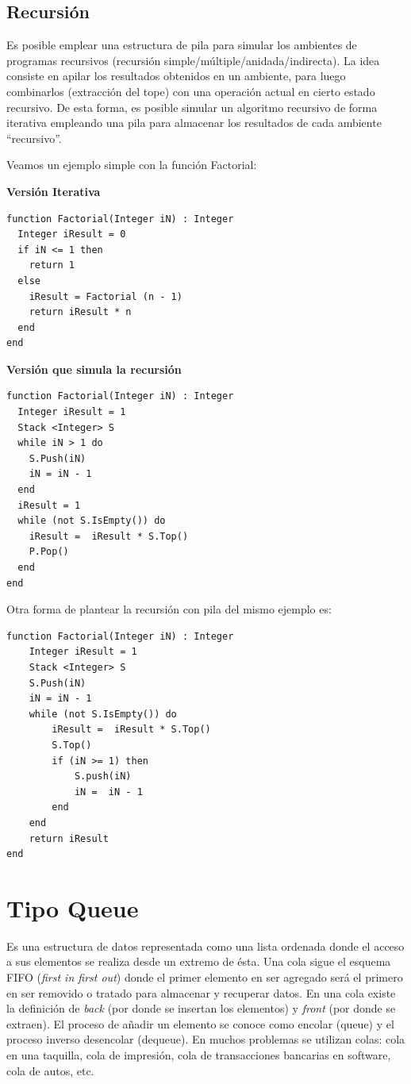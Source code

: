 \subsection{Recursión} \label{sec:recstack}

Es posible emplear una estructura de pila para simular los ambientes de programas recursivos (recursión simple/múltiple/anidada/indirecta). La idea consiste en apilar los resultados obtenidos en un ambiente, para luego combinarlos (extracción del tope) con una operación actual en cierto estado recursivo. De esta forma, es posible simular un algoritmo recursivo de forma iterativa empleando una pila para almacenar los resultados de cada ambiente “recursivo”.

Veamos un ejemplo simple con la función Factorial:

\textbf{Versión Iterativa}
\begin{lstlisting}[upquote=true, language=pseudo]
function Factorial(Integer iN) : Integer
  Integer iResult = 0
  if iN <= 1 then
    return 1
  else
    iResult = Factorial (n - 1)
    return iResult * n
  end
end
\end{lstlisting}

\textbf{Versión que simula la recursión}
\begin{lstlisting}[upquote=true, language=pseudo]
function Factorial(Integer iN) : Integer
  Integer iResult = 1
  Stack <Integer> S
  while iN > 1 do
    S.Push(iN)
    iN = iN - 1
  end
  iResult = 1
  while (not S.IsEmpty()) do
    iResult =  iResult * S.Top()
    P.Pop()
  end
end
\end{lstlisting}

Otra forma de plantear la recursión con pila del mismo ejemplo es:
\begin{lstlisting}[upquote=true, language=pseudo]
function Factorial(Integer iN) : Integer
    Integer iResult = 1
    Stack <Integer> S
    S.Push(iN)
    iN = iN - 1
    while (not S.IsEmpty()) do
        iResult =  iResult * S.Top()
        S.Top()
        if (iN >= 1) then
            S.push(iN)
            iN =  iN - 1
        end
    end
    return iResult
end
\end{lstlisting}

\section{Tipo Queue}

Es una estructura de datos representada como una lista ordenada donde el acceso a sus elementos se realiza desde un extremo de ésta. Una cola sigue el esquema FIFO (\textit{first in first out}) donde el primer elemento en ser agregado será el primero en ser removido o tratado para almacenar y recuperar datos. En una cola existe la definición de \textit{back} (por donde se insertan los elementos) y \textit{front} (por donde se extraen). El proceso de añadir un elemento se conoce como encolar (queue) y el proceso inverso desencolar (dequeue). En muchos problemas se utilizan colas: cola en una taquilla, cola de impresión, cola de transacciones bancarias en software, cola de autos, etc.

